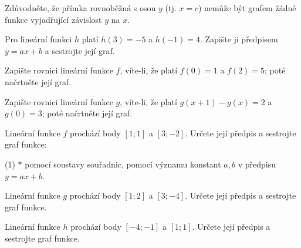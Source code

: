 \documentclass[12pt,a4paper]{article}
\begin{document}
\begin{exercise}
    Zdůvodněte, že přímka rovnoběžná s osou $y$ (tj. $x=c$) nemůže být grafem žádné funkce vyjadřující závislost $y$ na $x$.
\end{exercise}


\begin{exercise}
    Pro lineární funkci $h$ platí $h(3)=-5$ a $h(-1)=4$. Zapište ji předpisem $y=ax+b$ a sestrojte její graf.
\end{exercise}


\begin{exercise}
    Zapište rovnici lineární funkce $f$, víte-li, že platí $f(0)=1$ a $f(2)=5$; poté načrtněte její graf.
\end{exercise}


\begin{exercise}
    Zapište rovnici lineární funkce $g$, víte-li, že platí $g(x+1)-g(x)=2$ a $g(0)=3$; poté načrtněte její graf.
\end{exercise}


\begin{exercise}
    Lineární funkce $f$ prochází body $[1;1]$ a $[3;-2]$.  
    Určete její předpis a sestrojte graf funkce:
    \begin{tasks}(1)
        \task $* $ pomocí soustavy souřadnic,
        \task pomocí významu konstant $a,b$ v předpisu $y=ax+b$.
    \end{tasks}
\end{exercise}


\begin{exercise}
    Lineární funkce $g$ prochází body $[1;2]$ a $[3;-4]$.  
    Určete její předpis a sestrojte graf funkce.
\end{exercise}


\begin{exercise}
    Lineární funkce $h$ prochází body $[-4;-1]$ a $[1;1]$.  
    Určete její předpis a sestrojte graf funkce.
\end{exercise}
\end{document}
